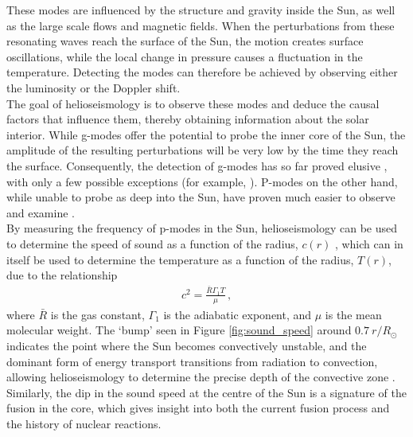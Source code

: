 \documentclass[11pt,a4paper,onecolumn]{report}
\begin{document}
These modes are influenced by the structure and gravity inside the Sun, as well
as the large scale flows and magnetic fields. When the perturbations from these
resonating waves reach the surface of the Sun, the motion creates surface
oscillations, while the local change in pressure causes a fluctuation in the
temperature. Detecting the modes can therefore be achieved by observing either the
luminosity or the Doppler shift.\\

The goal of helioseismology is to observe these modes and deduce the causal
factors that influence them, thereby obtaining information about the solar
interior. While g-modes offer the potential to probe the inner core of the Sun,
the amplitude of the resulting perturbations will be very low by the time they
reach the surface. Consequently, the detection of g-modes has so far proved
elusive \citep{appourchaux_quest_2010}, with only a few possible exceptions (for
example, \citealp{fossat_asymptotic_2017}). P-modes on the other hand, while
unable to probe as deep into the Sun, have proven much easier to observe and
examine \citep{deubner_observations_1975}. \\

By measuring the frequency of p-modes in the Sun, helioseismology can be used to determine
the speed of sound as a function of the radius, \(c\left(r\right)\)
\citep{christensen-dalsgaard_speed_1985}, which can in itself be used to
determine the temperature as a function of the radius, \(T\left(r\right)\), due
to the relationship
\begin{align}
  c^2 = \frac{\bar{R}\Gamma_1 T}{\mu} \,,
\end{align}
where \(\bar{R}\) is the gas constant, \(\Gamma_1\) is the adiabatic exponent,
and \(\mu\) is the mean molecular weight. The `bump' seen in Figure
\ref{fig:sound_speed} around \(\SI{0.7}{r \per R_\odot}\) indicates the point where the
Sun becomes convectively unstable, and the dominant form of energy transport
transitions from radiation to convection, allowing helioseismology to determine
the precise depth of the convective zone
\citep{christensen-dalsgaard_speed_1985}. Similarly, the dip in the sound speed
at the centre of the Sun is a signature of the fusion in the core, which gives
insight into both the current fusion process and the history of nuclear
reactions. \\

\end{document}
